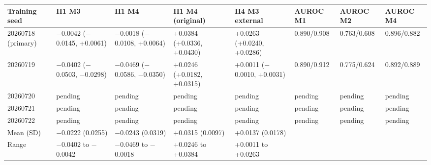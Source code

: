 \begin{tabular}{llllllll}
\toprule
Training seed & H1 M3 & H1 M4 & H1 M4 (original) & H4 M3 external & AUROC M1 & AUROC M2 & AUROC M4\\
\midrule
20260718 (primary) & $-$0.0042 ($-$0.0145, +0.0061) & $-$0.0018 ($-$0.0108, +0.0064) & +0.0384 (+0.0336, +0.0430) & +0.0263 (+0.0240, +0.0286) & 0.890/0.908 & 0.763/0.608 & 0.896/0.882\\
20260719 & $-$0.0402 ($-$0.0503, $-$0.0298) & $-$0.0469 ($-$0.0586, $-$0.0350) & +0.0246 (+0.0182, +0.0315) & +0.0011 ($-$0.0010, +0.0031) & 0.890/0.912 & 0.775/0.624 & 0.892/0.889\\
20260720 & pending & pending & pending & pending & pending & pending & pending\\
20260721 & pending & pending & pending & pending & pending & pending & pending\\
20260722 & pending & pending & pending & pending & pending & pending & pending\\
\midrule
Mean (SD) & $-$0.0222 (0.0255) & $-$0.0243 (0.0319) & +0.0315 (0.0097) & +0.0137 (0.0178) & & & \\
Range & $-$0.0402 to $-$0.0042 & $-$0.0469 to $-$0.0018 & +0.0246 to +0.0384 & +0.0011 to +0.0263 & & & \\
\bottomrule
\end{tabular}
